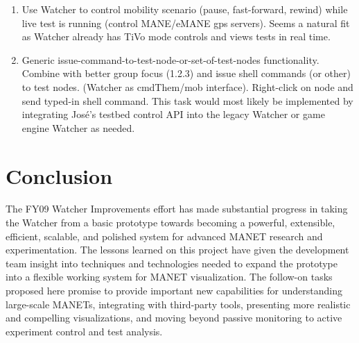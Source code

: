 \documentclass{report}
\begin{document}
\begin{enumerate}
\begin{enumerate}
    \item Use Watcher to control mobility scenario (pause, fast-forward, rewind) while live test is running (control MANE\slash eMANE gps servers). Seems a natural fit as Watcher already has TiVo mode controls and views tests in real time. 
    \item Generic issue-command-to-test-node-or-set-of-test-nodes functionality. Combine with better group focus (1.2.3) and issue shell commands (or other) to test nodes. (Watcher as cmdThem\slash mob interface). Right-click on node and send typed-in shell command. This task would most likely be implemented by integrating Jos\'{e}'s testbed control API into the legacy Watcher or game engine Watcher as needed. 
\end{enumerate}
\end{enumerate}

\section{Conclusion}


The FY09 Watcher Improvements effort has made substantial progress
in taking the Watcher from a basic prototype towards becoming a
powerful, extensible, efficient, scalable, and polished system for advanced MANET
research and experimentation. The lessons learned on this project have given the 
development team insight into techniques and technologies needed to expand the prototype 
into a flexible working system for MANET visualization.  The follow-on tasks proposed here
promise to provide important new capabilities for understanding
large-scale MANETs, integrating with third-party tools, presenting 
more realistic and compelling visualizations, and moving beyond passive 
monitoring to active experiment control and test analysis. 
\end{document}
